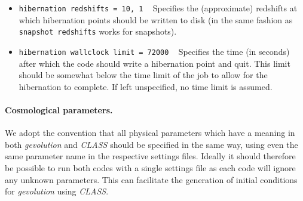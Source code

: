 \documentclass[a4paper,10pt]{article}
\begin{document}
\begin{itemize}
 \item[] \hspace{-25pt}\texttt{hibernation redshifts = 10, 1} ~ Specifies the (approximate) redshifts at which hibernation points should be
 written to disk (in the same fashion as \texttt{snapshot redshifts} works for snapshots).
 \item[] \hspace{-25pt}\texttt{hibernation wallclock limit = 72000} ~ Specifies the time (in seconds) after which the code should write
 a hibernation point and quit. This limit should be somewhat below the time limit of the job to allow for the hibernation to complete.
 If left unspecified, no time limit is assumed.
\end{itemize}


\paragraph{Cosmological parameters.} We adopt the convention that all physical parameters which have a meaning in both \textit{gevolution} and \textit{CLASS} should be specified in the same way, using even the same parameter name in the respective settings files. Ideally it should therefore be possible to run both codes with a single settings file as each code will ignore any unknown parameters. This can facilitate the generation of initial conditions for \textit{gevolution} using \textit{CLASS}.
\end{document}
